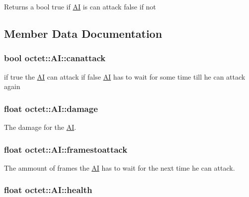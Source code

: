 \begin{DoxyReturn}{Returns}
a bool true if \hyperlink{structoctet_1_1_a_i}{A\+I} is can attack false if not 
\end{DoxyReturn}


\subsection{Member Data Documentation}
\hypertarget{structoctet_1_1_a_i_a0176ad3aed0864d973ad6ad9cbda02d0}{
\subsubsection[{canattack}]{\setlength{\rightskip}{0pt plus 5cm}bool octet\+::\+A\+I\+::canattack}}\label{structoctet_1_1_a_i_a0176ad3aed0864d973ad6ad9cbda02d0}


if true the \hyperlink{structoctet_1_1_a_i}{A\+I} can attack if false \hyperlink{structoctet_1_1_a_i}{A\+I} has to wait for some time till he can attack again 

\hypertarget{structoctet_1_1_a_i_a1d0e4f22af8d053827acec1f42cf0f41}{
\subsubsection[{damage}]{\setlength{\rightskip}{0pt plus 5cm}float octet\+::\+A\+I\+::damage}}\label{structoctet_1_1_a_i_a1d0e4f22af8d053827acec1f42cf0f41}


The damage for the \hyperlink{structoctet_1_1_a_i}{A\+I}. 

\hypertarget{structoctet_1_1_a_i_a9c7ae85a59d85e836a4a2137b0f9455f}{
\subsubsection[{framestoattack}]{\setlength{\rightskip}{0pt plus 5cm}float octet\+::\+A\+I\+::framestoattack}}\label{structoctet_1_1_a_i_a9c7ae85a59d85e836a4a2137b0f9455f}


The ammount of frames the \hyperlink{structoctet_1_1_a_i}{A\+I} has to wait for the next time he can attack. 

\hypertarget{structoctet_1_1_a_i_a830fe8ab096f675af501eb5a86bf7b00}{
\subsubsection[{health}]{\setlength{\rightskip}{0pt plus 5cm}float octet\+::\+A\+I\+::health}}\label{structoctet_1_1_a_i_a830fe8ab096f675af501eb5a86bf7b00}


